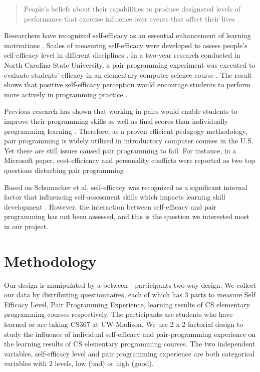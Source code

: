 \documentclass{sigchi}
\begin{document}
\begin{quote}
People's beliefs about their capabilities to produce designated levels of performance that exercise influence over events that affect their lives \cite{bandura1997self}. 
\end{quote}

Researchers have recognized self-efficacy as an essential enhancement of learning motivations \cite{zimmerman2000self}. Scales of measuring self-efficacy were developed to assess people's self-efficacy level in different disciplines \cite{sherer1982self}. In a two-year research conducted in North Carolina State University, a pair programming experiment was executed to evaluate students' efficacy in an elementary computer science course \cite{williams2001support}. The result shows that positive self-efficacy perception would encourage students to perform more actively in programming practice \cite{kinnunen2011cs}. 

Previous research has shown that working in pairs would enable students to improve their programming skills as well as final scores than individually programming learning \cite{williams2000all,mcdowell2002effects,mcdowell2003impact}. Therefore, as a proven efficient pedagogy methodology, pair programming is widely utilized in introductory computer courses in the U.S. Yet there are still issues caused pair programming to fail. For instance, in a Microsoft paper, cost-efficiency and personality conflicts were reported as two top questions disturbing pair programming \cite{begel2008pair}.

Based on Schumacher et al, self-efficacy was recognized as a significant internal factor that influencing self-assessment skills which impacts learning skill development \cite{schumacher2013developing}. However, the interaction between self-efficacy and pair programming has not been assessed, and this is the question we interested most in our project.


\section{Methodology}
Our design is manipulated by a between - participants two way design. We collect our data by distributing questionnaires, each of which has 3 parts to measure Self Efficacy Level, Pair Programming Experience, learning results of CS elementary programming courses respectively. The participants are students who have learned or are taking CS367 at UW-Madison. We use 2 x 2 factorial design to study the influence of individual self-efficacy and pair-programming experience on the learning results of CS elementary programming courses. The two independent variables, self-efficacy level and pair programming experience are both categorical variables with 2 levels, low (bad) or high (good). 
\end{document}
